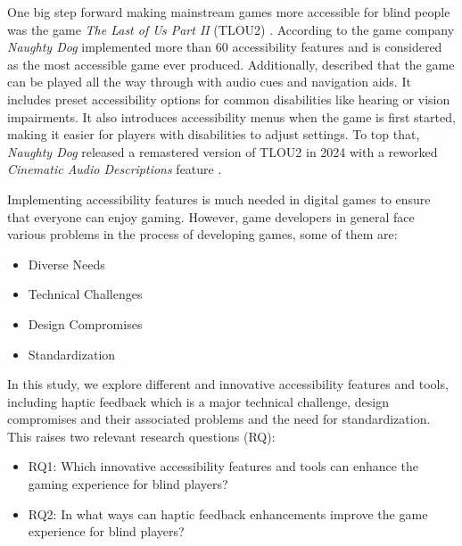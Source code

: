 \documentclass[sigconf,natbib=false,10pt]{acmart}
\begin{document}
	One big step forward making mainstream games more accessible for blind people was the game \emph{The Last of Us Part II} (TLOU2) \cite{playstation_last_2020, playstation_last_2020-1}. 
	According to \textcite{leite_extended_2021} the game company \emph{Naughty Dog} implemented more than 60 accessibility features and is considered as the most accessible game ever produced.
	Additionally, \textcite{dale_last_2024} described that the game can be played all the way through with audio cues and navigation aids.
	It includes preset accessibility options for common disabilities like hearing or vision impairments. 
	It also introduces accessibility menus when the game is first started, making it easier for players with disabilities to adjust settings.
	To top that, \emph{Naughty Dog} released a remastered version of TLOU2 in 2024 with a reworked \emph{Cinematic Audio Descriptions} feature \cite{playstation_last_2024}.
	
	Implementing accessibility features is much needed in digital games to ensure that everyone can enjoy gaming.
	However, game developers in general face various problems in the process of developing games, some of them are:
	
	\begin{itemize}
		\setlength\itemsep{0.5em}
		\item Diverse Needs
		\item Technical Challenges
		\item Design Compromises
		\item Standardization
	\end{itemize}
	
	In this study, we explore different and innovative accessibility features and tools, including haptic feedback which is a major technical challenge, design compromises and their associated problems and the need for standardization.
	This raises two relevant research questions (RQ):
	
	\begin{itemize}
		\setlength\itemsep{0.5em}
		\item RQ1: Which innovative accessibility features and tools can enhance the gaming experience for blind players?
		\item RQ2: In what ways can haptic feedback enhancements improve the game experience for blind players?
	\end{itemize}
	
\end{document}
